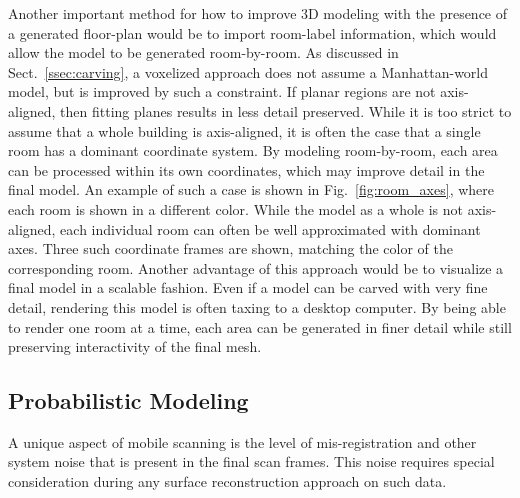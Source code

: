 \documentclass[journal]{IEEEtran}
\begin{document}
Another important method for how to improve 3D modeling with the presence of a generated floor-plan would be to import room-label information, which would allow the model to be generated room-by-room.  As discussed in Sect.~\ref{ssec:carving}, a voxelized approach does not assume a Manhattan-world model, but is improved by such a constraint.  If planar regions are not axis-aligned, then fitting planes results in less detail preserved.  While it is too strict to assume that a whole building is axis-aligned, it is often the case that a single room has a dominant coordinate system.  By modeling room-by-room, each area can be processed within its own coordinates, which may improve detail in the final model.  An example of such a case is shown in Fig.~\ref{fig:room_axes}, where each room is shown in a different color.  While the model as a whole is not axis-aligned, each individual room can often be well approximated with dominant axes.  Three such coordinate frames are shown, matching the color of the corresponding room.  Another advantage of this approach would be to visualize a final model in a scalable fashion.  Even if a model can be carved with very fine detail, rendering this model is often taxing to a desktop computer.  By being able to render one room at a time, each area can be generated in finer detail while still preserving interactivity of the final mesh.

\subsection{Probabilistic Modeling}
\label{ssec:probabilistic}

A unique aspect of mobile scanning is the level of mis-registration and other system noise that is present in the final scan frames.  This noise requires special consideration during any surface reconstruction approach on such data.
\end{document}
